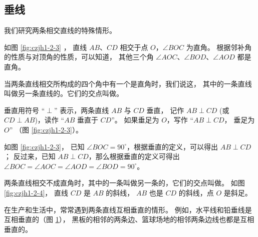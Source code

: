 \subsection{垂线}\label{subsec:czjh1-2-2}

我们研究两条相交直线的特殊情形。

如图 \ref{fig:czjh1-2-3} ， 直线 $AB$、$CD$ 相交于点 $O$，$\angle BOC$ 为直角。
根据邻补角的性质与对顶角的性质，可以知道，
其他三个角 $\angle AOC$、$\angle BOD$、$\angle AOD$ 都是直角。

当两条直线相交所构成的四个角中有一个是直角时，我们说这，
其中的一条直线叫做另一条直线的。它们的交点叫做。

垂直用符号 “$\perp$” 表示，两条直线 $AB$ 与 $CD$ 垂直，
记作 $AB \perp CD$ (或 $CD \perp AB$)，读作 “$AB$ 垂直于 $CD$”。
如果垂足为 $O$，写作 “$AB \perp CD$， 垂足为 $O$” （图 \ref{fig:czjh1-2-3}）。

如图 \ref{fig:czjh1-2-3}， 已知 $\angle BOC = 90^\circ$，根据垂直的定义，可以得出 $AB \perp CD$；
反过来，已知 $AB \perp CD$，那么根据垂直的定义可得出 $\angle BOC = \angle AOC = \angle AOD = \angle BOD = 90^\circ$。

\begin{figure}[htbp]
    \centering
    \begin{minipage}[b]{4cm}
        \centering
        
        \caption{}\label{fig:czjh1-2-3}
    \end{minipage}
    \qquad
    \begin{minipage}[b]{4cm}
        \centering
        
        \caption{}\label{fig:czjh1-2-4}
    \end{minipage}
    \qquad
    \begin{minipage}[b]{5cm}
        \centering
        
        \caption{}\label{fig:czjh1-2-5}
    \end{minipage}
\end{figure}

两条直线相交不成直角时，其中的一条叫做另一条的，它们的交点叫做。
如图 \ref{fig:czjh1-2-4}， 直线 $CD$ 是 $AB$ 的斜线， $AB$ 也是 $CD$ 的斜线，点 $O$ 是斜足。

在生产和生活中，常常遇到两条直线互相垂直的情形。
例如，水平线和铅垂线是互相垂直的（图 \ref{fig:czjh1-2-5}），
黑板的相邻的两条边、篮球场地的相邻两条边线也都是互相垂直的。

